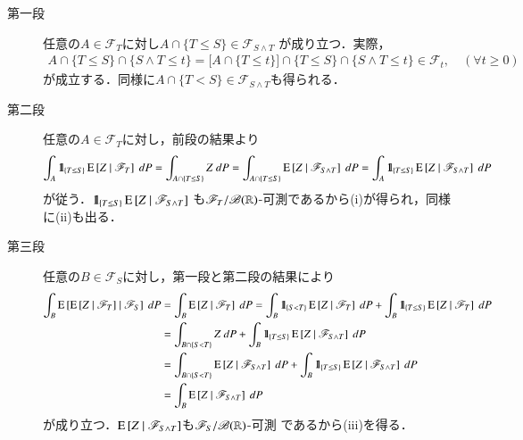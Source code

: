 	\begin{prf}\mbox{}
		\begin{description}
			\item[第一段]
				任意の$A \in \mathscr{F}_T$に対し$A \cap \{T \leq S\} \in \mathscr{F}_{S \wedge T}$
				が成り立つ．実際，
				\begin{align}
					A \cap \{T \leq S\} \cap \{S \wedge T \leq t\}
					= \biggl[ A \cap \{T \leq t\} \biggr] \cap \{T \leq S\} \cap \{S \wedge T \leq t\}
					\in \mathscr{F}_t,
					\quad (\forall t \geq 0)
				\end{align}
				が成立する．同様に$A \cap \{T < S\} \in \mathscr{F}_{S \wedge T}$も得られる．
				
			\item[第二段]
				任意の$A \in \mathscr{F}_T$に対し，前段の結果より
				\begin{align}
					\int_A \mbox{1}\hspace{-0.25em}\mbox{l}_{\{T \leq S\}} \operatorname{E} \left[ Z \ \middle|\ \mathscr{F}_T \right]\ dP
					= \int_{A \cap \{T \leq S\}} Z\ dP
					= \int_{A \cap \{T \leq S\}} \operatorname{E} \left[ Z \ \middle|\ \mathscr{F}_{S \wedge T} \right]\ dP
					= \int_A \mbox{1}\hspace{-0.25em}\mbox{l}_{\{T \leq S\}} \operatorname{E} \left[ Z \ \middle|\ \mathscr{F}_{S \wedge T} \right]\ dP
				\end{align}
				が従う．$\mbox{1}\hspace{-0.25em}\mbox{l}_{\{T \leq S\}} \operatorname{E} \left[ Z \ \middle|\ \mathscr{F}_{S \wedge T} \right]$
				も$\mathscr{F}_T/\mathscr{B}(\mathbb{R})$-可測であるから(i)が得られ，同様に(ii)も出る．
			
			\item[第三段]
				任意の$B \in \mathscr{F}_S$に対し，第一段と第二段の結果により
				\begin{align}
					\int_B \operatorname{E} \left[ \operatorname{E} \left[ Z \ \middle|\ \mathscr{F}_T \right] \ \middle|\ \mathscr{F}_S \right]\ dP
					&= \int_B \operatorname{E} \left[ Z \ \middle|\ \mathscr{F}_T \right]\ dP
					= \int_B \mbox{1}\hspace{-0.25em}\mbox{l}_{\{S < T\}} \operatorname{E} \left[ Z \ \middle|\ \mathscr{F}_T \right]\ dP
						+ \int_B \mbox{1}\hspace{-0.25em}\mbox{l}_{\{T \leq S\}} \operatorname{E} \left[ Z \ \middle|\ \mathscr{F}_T \right]\ dP \\
					&= \int_{B \cap \{S < T\}} Z\ dP
						+ \int_B \mbox{1}\hspace{-0.25em}\mbox{l}_{\{T \leq S\}} \operatorname{E} \left[ Z \ \middle|\ \mathscr{F}_{S \wedge T} \right]\ dP \\
					&= \int_{B \cap \{S < T\}} \operatorname{E} \left[ Z \ \middle|\ \mathscr{F}_{S \wedge T} \right]\ dP
						+ \int_B \mbox{1}\hspace{-0.25em}\mbox{l}_{\{T \leq S\}} \operatorname{E} \left[ Z \ \middle|\ \mathscr{F}_{S \wedge T} \right]\ dP \\
					&= \int_B \operatorname{E} \left[ Z \ \middle|\ \mathscr{F}_{S \wedge T} \right]\ dP
				\end{align}
				が成り立つ．$\operatorname{E} \left[ Z \ \middle|\ \mathscr{F}_{S \wedge T} \right]$も$\mathscr{F}_S/\mathscr{B}(\mathbb{R})$-可測
				であるから(iii)を得る．
				\QED
		\end{description}
	\end{prf}
	